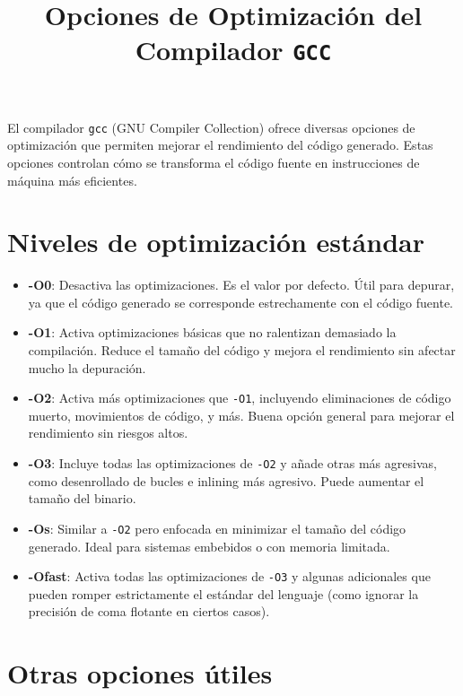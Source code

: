 \documentclass[12pt]{article}
\title{Opciones de Optimización del Compilador \texttt{GCC}}
\author{}
\date{}
\begin{document}
\maketitle

El compilador \texttt{gcc} (GNU Compiler Collection) ofrece diversas opciones de optimización que permiten mejorar el rendimiento del código generado. Estas opciones controlan cómo se transforma el código fuente en instrucciones de máquina más eficientes.

\section*{Niveles de optimización estándar}

\begin{itemize}
  \item \textbf{-O0}: Desactiva las optimizaciones. Es el valor por defecto. Útil para depurar, ya que el código generado se corresponde estrechamente con el código fuente.

  \item \textbf{-O1}: Activa optimizaciones básicas que no ralentizan demasiado la compilación. Reduce el tamaño del código y mejora el rendimiento sin afectar mucho la depuración.

  \item \textbf{-O2}: Activa más optimizaciones que \texttt{-O1}, incluyendo eliminaciones de código muerto, movimientos de código, y más. Buena opción general para mejorar el rendimiento sin riesgos altos.

  \item \textbf{-O3}: Incluye todas las optimizaciones de \texttt{-O2} y añade otras más agresivas, como desenrollado de bucles e inlining más agresivo. Puede aumentar el tamaño del binario.

  \item \textbf{-Os}: Similar a \texttt{-O2} pero enfocada en minimizar el tamaño del código generado. Ideal para sistemas embebidos o con memoria limitada.

  \item \textbf{-Ofast}: Activa todas las optimizaciones de \texttt{-O3} y algunas adicionales que pueden romper estrictamente el estándar del lenguaje (como ignorar la precisión de coma flotante en ciertos casos).

\end{itemize}

\section*{Otras opciones útiles}
\end{document}
